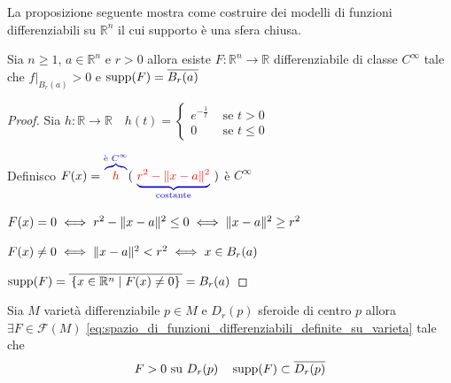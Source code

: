         \newpage
        La proposizione seguente mostra come costruire dei modelli di funzioni differenziabili su $\mathbb{R}^n$ il cui supporto è una sfera chiusa.
        \begin{proposizione}
        \label{prop:costruzione_di_funzioni_diff_su_Rn_il_cui_supporto_sfera_chiusa}
        \mbox{}

        Sia $n \geq 1$, $a \in \mathbb{R}^n$ e $r>0$ allora esiste $F \colon \mathbb{R}^n \to \mathbb{R}$ differenziabile di classe $C^\infty$
        tale che $f|_{B_r(a)}>0$ e $\operatorname{supp}(F) = \overline{B_r(a)}$
        \end{proposizione}
        \begin{proof}
        \mbox{}

        Sia $h \colon \mathbb{R} \to \mathbb{R} \quad h(t)= \begin{cases}
            e^{-\frac{1}{t}} & \text{ se } t>0 \\
            0 & \text{ se } t \leq 0 
        \end{cases}$

        Definisco \textcolor{red}{$F(x)=\textcolor{blu}{\overbrace{\textcolor{red}{h}}^{\text{è } C^\infty}}( \, \, \textcolor{blu}{\underbrace{\textcolor{red}{r^2-\norm{x-a}^2}}_{\text{costante}}} \, \, )$} è $C^\infty$

        $F(x)=0 \iff r^2 - \lVert x-a\rVert^2 \leq 0 \iff \lVert x-a\rVert^2 \geq r^2$

        $F(x) \neq 0 \iff \lVert x-a\rVert^2 < r^2 \iff x \in B_r(a)$

        $\operatorname{supp}(F) = \overline{\, \left\{x \in \mathbb{R}^n \mid F(x) \neq 0 \right\} \,} = B_r(a)$
        \end{proof}
        \begin{proposizione}
        \mbox{}

        Sia $M$ varietà differenziabile $p \in M$ e $D_r(p)$ sferoide di centro $p$
        allora $\exists F \in \mathcal{F}(M)$ \textcolor{violet}{\eqref{eq:spazio_di_funzioni_differenziabili_definite_su_varieta}} tale che 
        \begin{equation}
        \label{eq:funzioni_diff_positive_su_uno_sferoide_con_supporto_contenuto_nella_chiusura}
        F>0 \text{ su } D_r(p) \quad \operatorname{supp}(F) \subset \overline{D_r(p)}
        \end{equation}
        \end{proposizione}
